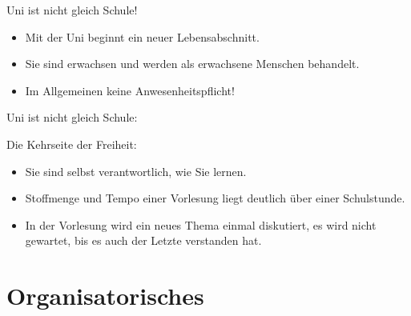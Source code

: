\documentclass[german]{beamer}
\begin{document}
\begin{frame}{Uni ist nicht gleich Schule!}

\begin{itemize}
\item Mit der Uni beginnt ein neuer Lebensabschnitt.

\item Sie sind erwachsen und werden als erwachsene Menschen behandelt.

\item Im Allgemeinen keine Anwesenheitspflicht!

\end{itemize}
\end{frame}

\begin{frame}{Uni ist nicht gleich Schule:}

Die Kehrseite der Freiheit:
\begin{itemize}
\item Sie sind selbst verantwortlich, wie Sie lernen.

\item Stoffmenge und Tempo einer Vorlesung liegt deutlich \"uber einer Schulstunde.

\item In der Vorlesung wird ein neues Thema \alert{einmal} diskutiert, es wird nicht gewartet, bis es auch der Letzte verstanden hat.

\end{itemize}
\end{frame}


\section{Organisatorisches}

\frame{\sectionpage}

\end{document}
